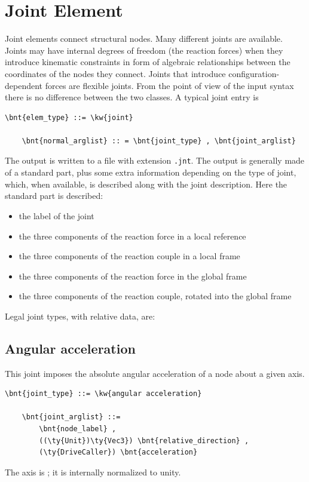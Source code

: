\section{Joint Element}
Joint elements connect structural nodes.
Many different joints are available. 
Joints may have internal degrees of freedom (the reaction forces)
when they introduce kinematic constraints in form of algebraic relationships
between the coordinates of the nodes they connect.
Joints that introduce configuration-dependent forces are flexible joints.
From the point of view of the input syntax there is no difference between
the two classes.
A typical joint entry is
\begin{Verbatim}[commandchars=\\\{\}]
    \bnt{elem_type} ::= \kw{joint}

    \bnt{normal_arglist} :: = \bnt{joint_type} , \bnt{joint_arglist}
\end{Verbatim}
The output is written to a file with extension \texttt{.jnt}.
The output is generally made of a standard part, plus some extra information
depending on the type of joint, which, when available, is described along
with the joint description.
Here the standard part is described:
\begin{itemize}
    \item the label of the joint
    \item the three components of the reaction force in a local reference
    \item the three components of the reaction couple in a local frame
    \item the three components of the reaction force in the global frame
    \item the three components of the reaction couple, rotated into the
          global frame
\end{itemize}
Legal joint types, with relative data, are:




\subsection{Angular acceleration}
This joint imposes the absolute angular acceleration of a node
about a given axis.
\begin{Verbatim}[commandchars=\\\{\}]
    \bnt{joint_type} ::= \kw{angular acceleration}

    \bnt{joint_arglist} ::=
        \bnt{node_label} ,
        ((\ty{Unit})\ty{Vec3}) \bnt{relative_direction} , 
        (\ty{DriveCaller}) \bnt{acceleration}
\end{Verbatim}
The axis is ; it is internally normalized to unity.

